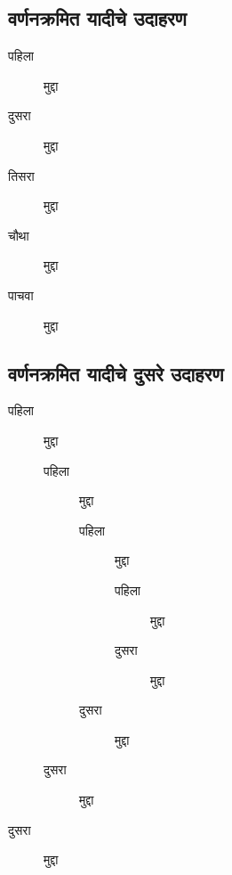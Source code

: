 \subsection{वर्णनक्रमित यादीचे उदाहरण}

\begin{description}
\item[पहिला] मुद्दा
\item[दुसरा] मुद्दा
\item[तिसरा] मुद्दा
\item[चौथा] मुद्दा
\item[पाचवा] मुद्दा
\end{description}

\subsection*{वर्णनक्रमित यादीचे दुसरे उदाहरण}

\begin{description}
\item[पहिला] मुद्दा
  \begin{description}
  \item[पहिला] मुद्दा
    \begin{description}
    \item[पहिला] मुद्दा
      \begin{description}
      \item[पहिला] मुद्दा
      \item[दुसरा] मुद्दा
      \end{description}
    \item[दुसरा] मुद्दा
    \end{description}
  \item[दुसरा] मुद्दा
  \end{description}
\item[दुसरा] मुद्दा
\end{description}
